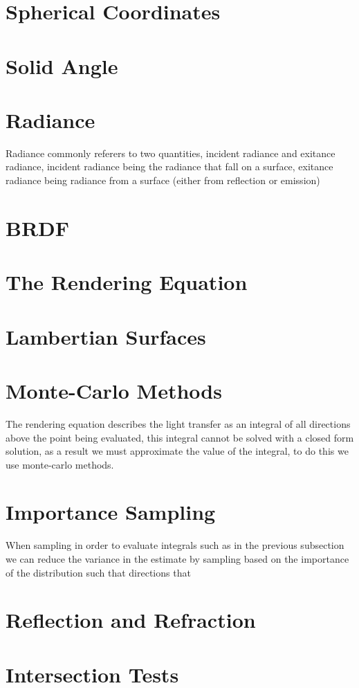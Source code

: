\section{Spherical Coordinates}
\section{Solid Angle}
\section{Radiance}
Radiance commonly referers to two quantities, incident radiance and exitance radiance, incident radiance being the radiance
that fall on a surface, exitance radiance being radiance from a surface (either from reflection or emission)

\section{BRDF}
\section{The Rendering Equation}
\section{Lambertian Surfaces}
\section{Monte-Carlo Methods}
The rendering equation describes the light transfer as an integral of all directions above the point being evaluated, this
integral cannot be solved with a closed form solution, as a result we must approximate the value of the integral, to do this
we use monte-carlo methods. 

\section{Importance Sampling}
When sampling in order to evaluate integrals such as in the previous subsection we can reduce the variance in the estimate by
sampling based on the importance of the distribution such that directions that 

\section{Reflection and Refraction}
\section{Intersection Tests}
